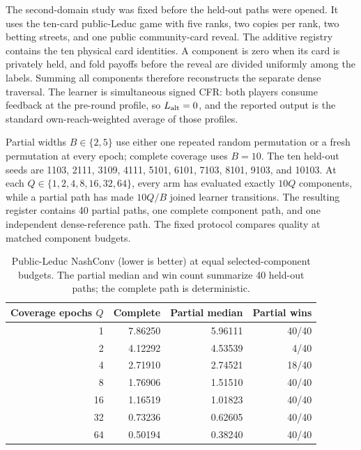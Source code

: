 The second-domain study was fixed before the held-out paths were opened.  It
uses the ten-card public-Leduc game with five ranks, two copies per rank, two
betting streets, and one public community-card reveal.  The additive registry
contains the ten physical card identities.  A component is zero when its card
is privately held, and fold payoffs before the reveal are divided uniformly
among the labels.  Summing all components therefore reconstructs the separate
dense traversal.  The learner is simultaneous signed CFR: both players consume
feedback at the pre-round profile, so $L_{\rm alt}=0$, and the reported output
is the standard own-reach-weighted average of those profiles.

Partial widths $B\in\{2,5\}$ use either one repeated random permutation or a
fresh permutation at every epoch; complete coverage uses $B=10$.  The ten
held-out seeds are 1103, 2111, 3109, 4111, 5101, 6101, 7103, 8101, 9103, and
10103.  At each $Q\in\{1,2,4,8,16,32,64\}$, every arm has evaluated exactly
$10Q$ components, while a partial path has made $10Q/B$ joined learner
transitions.  The resulting register contains 40 partial paths, one complete
component path, and one independent dense-reference path.  The fixed protocol
compares quality at matched component budgets.

\begin{table}[h]
\caption{Public-Leduc NashConv (lower is better) at equal selected-component
budgets.  The partial median and win count summarize 40 held-out paths; the
complete path is deterministic.}
\label{tab:app-leduc-budget}
\centering\small
\begin{tabular}{@{}rrrr@{}}
\toprule
Coverage epochs $Q$ & Complete & Partial median & Partial wins \\
\midrule
1  & 7.86250 & 5.96111 & 40/40 \\
2  & 4.12292 & 4.53539 &  4/40 \\
4  & 2.71910 & 2.74521 & 18/40 \\
8  & 1.76906 & 1.51510 & 40/40 \\
16 & 1.16519 & 1.01823 & 40/40 \\
32 & 0.73236 & 0.62605 & 40/40 \\
64 & 0.50194 & 0.38240 & 40/40 \\
\bottomrule
\end{tabular}
\end{table}

